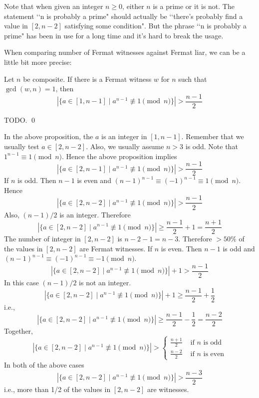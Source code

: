 Note that when given an integer $n \geq 0$, either $n$ is a prime
or it is not.
The statement \lq\lq n is probably a prime" should actually be
\lq\lq there's probably find a value in $[2, n-2]$
satisfying some condition".
But the phrase \lq\lq n is probably a prime" has been in use for a long
time and it's hard to break the usage.

When comparing number of Fermat witnesses against Fermat liar,
we can be a little bit more precise:

\begin{prop}
  Let $n$ be composite.
  If there is a Fermat witness $w$ for $n$ such that $\gcd(w, n) = 1$, then
  \[
  |\{a \in [1, n - 1] \mid a^{n-1} \not\equiv 1 \pmod{n} \}| > \frac{n - 1}{2}
  \]
\end{prop}
\proof
TODO.
\qed


In the above proposition, the $a$ is an integer in $[1, n - 1]$.
Remember that we usually test $a \in [2, n-2]$.
Also, we usually assume $n > 3$ is odd.
Note that $1^{n-1} \equiv 1 \pmod{n}$.
Hence the above proposition implies
\[
|\{a \in [2, n - 1] \mid a^{n-1} \not\equiv 1 \pmod{n} \}| > \frac{n - 1}{2}
\]
If $n$ is odd.
Then $n - 1$ is even and $(n-1)^{n-1} \equiv (-1)^{n-1} \equiv 1 \pmod{n}$.
Hence
\[
|\{a \in [2, n - 2] \mid a^{n-1} \not\equiv 1 \pmod{n} \}| > \frac{n - 1}{2}
\]
Also, $(n - 1)/2$ is an integer.
Therefore
\[
|\{a \in [2, n - 2] \mid a^{n-1} \not\equiv 1 \pmod{n} \}| \geq \frac{n - 1}{2}
+ 1 = \frac{n + 1}{2} 
\]
The number of integer in $[2, n - 2]$ is $n - 2 - 1 = n - 3$.
Therefore $>50\%$ of the values in $[2, n - 2]$ are Fermat witnesses.
If $n$ is even.
Then $n - 1$ is odd and $(n-1)^{n-1} \equiv (-1)^{n-1} \equiv -1 \pmod{n}$.
\[
|\{a \in [2, n - 2] \mid a^{n-1} \not\equiv 1 \pmod{n} \}| + 1 > \frac{n - 1}{2}
\]
In this case $(n - 1)/2$ is not an integer.
\[
|\{a \in [2, n - 2] \mid a^{n-1} \not\equiv 1 \pmod{n} \}| + 1
\geq \frac{n - 1}{2} + \frac{1}{2}
\]
i.e.,
\[
|\{a \in [2, n - 2] \mid a^{n-1} \not\equiv 1 \pmod{n} \}|
\geq \frac{n - 1}{2} - \frac{1}{2}
= \frac{n - 2}{2}
\]
Together,
\[
|\{a \in [2, n - 2] \mid a^{n-1} \not\equiv 1 \pmod{n} \}| >
\begin{cases}
  \displaystyle \frac{n + 1}{2} & \text{ if $n$ is odd} \\
  \displaystyle \frac{n - 2}{2} & \text{ if $n$ is even}
\end{cases}
\]
In both of the above cases
\[
|\{a \in [2, n - 2] \mid a^{n-1} \not\equiv 1 \pmod{n} \}| > \frac{n - 3}{2}
\]
i.e., more than 1/2 of the values in $[2, n - 2]$ are witnesses.

